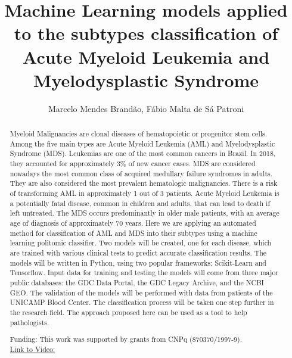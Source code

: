 \documentclass[twoside]{article}
\title{\vspace{-15mm}\fontsize{24pt}{10pt}\selectfont\textbf{ Machine Learning models applied to the subtypes classification of Acute Myeloid Leukemia and Myelodysplastic Syndrome }} %
\author{ Marcelo Mendes Brand\~ao,  F\'abio Malta de S\'a Patroni }
\affil{ UNIVERSIDADE ESTADUAL DE CAMPINAS }
\date{}
\begin{document}
  
  
  \maketitle %
  
  
  \thispagestyle{fancy} %
  
  
  \begin{abstract}
  Myeloid Malignancies are clonal diseases of hematopoietic or progenitor stem cells. Among the five main types are Acute Myeloid Leukemia (AML) and Myelodysplastic Syndrome (MDS). Leukemias are one of the most common cancers in Brazil. In 2018,  they accounted for approximately 3\% of new cancer cases. MDS are considered nowadays the most common class of acquired medullary failure syndromes in adults. They are also considered the most prevalent hematologic malignancies. There is a risk of transforming AML in approximately 1 out of 3 patients. Acute Myeloid Leukemia is a potentially fatal disease,  common in children and adults,  that can lead to death if left untreated. The MDS occurs predominantly in older male patients,  with an average age of diagnosis of approximately 70 years. Here we are applying an automated method for classification of AML and MDS into their subtypes using a machine learning politomic classifier. Two models will be created,  one for each disease,  which are trained with various clinical tests to predict accurate classification results.  The models will be written in Python,  using two popular frameworks: Scikit-Learn and Tensorflow. Input data for training and testing the models will come from three major public databases: the GDC Data Portal,  the GDC Legacy Archive,  and the NCBI GEO. The validation of the models will be performed with data from patients of the UNICAMP Blood Center. The classification process will be taken one step further in the research field. The approach proposed here can be used as a tool to help pathologists.
  
  Funding: This work was supported by grants from CNPq (870370/1997-9). \\
  \href{http://ab3c.org.br/xpress_pres2020/xmxp2020-304988.html}{Link to Video:}

  \end{abstract}
   
  
\end{document}
